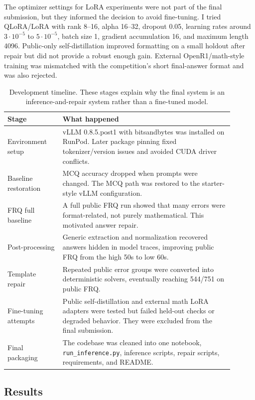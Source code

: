 \documentclass{article}
\begin{document}
The optimizer settings for LoRA experiments were not part of the final submission, but they informed the decision to avoid fine-tuning. I tried QLoRA/LoRA with rank 8--16, alpha 16--32, dropout 0.05, learning rates around $3\cdot 10^{-5}$ to $5\cdot 10^{-5}$, batch size 1, gradient accumulation 16, and maximum length 4096. Public-only self-distillation improved formatting on a small holdout after repair but did not provide a robust enough gain. External OpenR1/math-style training was mismatched with the competition's short final-answer format and was also rejected.

\begin{table}[h]
\caption{Development timeline. These stages explain why the final system is an inference-and-repair system rather than a fine-tuned model.}
\label{tab:timeline}
\centering
\begin{tabular}{p{0.22\linewidth}p{0.68\linewidth}}
\toprule
Stage & What happened \\
\midrule
Environment setup & vLLM 0.8.5.post1 with bitsandbytes was installed on RunPod. Later package pinning fixed tokenizer/version issues and avoided CUDA driver conflicts. \\
Baseline restoration & MCQ accuracy dropped when prompts were changed. The MCQ path was restored to the starter-style vLLM configuration. \\
FRQ full baseline & A full public FRQ run showed that many errors were format-related, not purely mathematical. This motivated answer repair. \\
Post-processing & Generic extraction and normalization recovered answers hidden in model traces, improving public FRQ from the high 50s to low 60s. \\
Template repair & Repeated public error groups were converted into deterministic solvers, eventually reaching 544/751 on public FRQ. \\
Fine-tuning attempts & Public self-distillation and external math LoRA adapters were tested but failed held-out checks or degraded behavior. They were excluded from the final submission. \\
Final packaging & The codebase was cleaned into one notebook, \texttt{run\_inference.py}, inference scripts, repair scripts, requirements, and README. \\
\bottomrule
\end{tabular}
\end{table}

\subsection{Results}
\label{sec:results}
\end{document}
